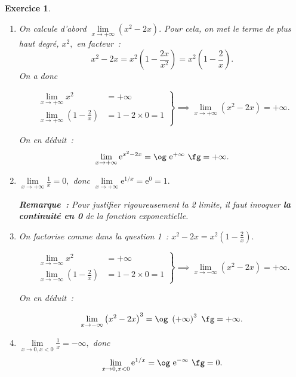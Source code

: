 \documentclass[10pt]{article}
\newtheorem{exo}{Exercice}
\begin{document}
\begin{exo}



\begin{enumerate}
\item On calcule d'abord $\lim\limits_{x\to +\infty}\left(x^2-2x\right).$ Pour cela, on met le terme de plus haut degré, $x^2,$ en facteur~:
\[x^2-2x=x^2\left(1-\frac{2x}{x^2}\right)=x^2\left(1-\frac{2}{x}\right).\]
On a donc

\[
\left.
    \begin{array}{ll}
        \lim\limits_{x\to +\infty}x^2&=  +\infty\\
        \lim\limits_{x\to +\infty}\left(1-\frac{2}{x}\right) &= 1-2\times 0=1
    \end{array}
\right \}\implies \lim\limits_{x\to +\infty}\left(x^2-2x\right)=+\infty.
\]

On en déduit~:
\[\lim\limits_{x\to +\infty}\text{e}^{x^2-2x}=\text{\og}~\text{e}^{+\infty}~\text{\fg}=+\infty.\]
\item $\lim\limits_{x\to +\infty}\frac{1}{x}=0,$ donc $\lim\limits_{x\to +\infty}\text{e}^{1/x}=\text{e}^0=1.$

\medskip

\textbf{Remarque~:} Pour justifier rigoureusement la 2 limite, il faut invoquer \textbf{la continuité en 0} de la fonction exponentielle.
\item On factorise comme dans la question 1~: $x^2-2x=x^2\left(1-\frac{2}{x}\right).$

\[
\left.
    \begin{array}{ll}
        \lim\limits_{x\to -\infty}x^2&=  +\infty\\
        \lim\limits_{x\to -\infty}\left(1-\frac{2}{x}\right) &= 1-2\times 0=1
    \end{array}
\right \}\implies \lim\limits_{x\to -\infty}\left(x^2-2x\right)=+\infty.
\]

On en déduit~:

\[\lim\limits_{x\to -\infty}\left(x^2-2x\right)^3=\text{\og}~\left({+\infty}\right)^3~\text{\fg}=+\infty.\]
\item $\lim\limits_{x\to 0,x<0}\frac{1}{x}=-\infty,$ donc \[\lim\limits_{x\to 0,x<0}\text{e}^{1/x}=\text{\og}~\text{e}^{-\infty}~\text{\fg}=0.\]
\end{enumerate}

\end{exo}
\end{document}
